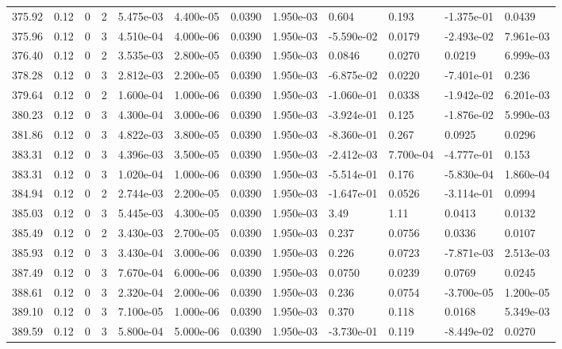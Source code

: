 \documentclass[preview]{standalone}
\begin{document}
{{{{{{{{{{{{\begin{tabular}{L{1.2cm}C{1.2cm} C{0.3cm}C{0.5cm} C{1.4cm}C{1.4cm} C{1.4cm}C{1.4cm} C{1.6cm}C{1.6cm} C{1.6cm}C{1.6cm}}
  375.92  &  0.12  & 0     &  2 &  5.475e-03  & 4.400e-05  &  0.0390&   1.950e-03& 0.604 & 0.193   &  -1.375e-01 & 0.0439  \\ 
  375.96  &  0.12  & 0     &  3 &  4.510e-04  & 4.000e-06  &  0.0390&   1.950e-03& -5.590e-02 & 0.0179   &  -2.493e-02 & 7.961e-03  \\ 
  376.40  &  0.12  & 0     &  2 &  3.535e-03  & 2.800e-05  &  0.0390&   1.950e-03& 0.0846 & 0.0270   &  0.0219 & 6.999e-03  \\ 
  378.28  &  0.12  & 0     &  3 &  2.812e-03  & 2.200e-05  &  0.0390&   1.950e-03& -6.875e-02 & 0.0220   &  -7.401e-01 & 0.236  \\ 
  379.64  &  0.12  & 0     &  2 &  1.600e-04  & 1.000e-06  &  0.0390&   1.950e-03& -1.060e-01 & 0.0338   &  -1.942e-02 & 6.201e-03  \\ 
  380.23  &  0.12  & 0     &  3 &  4.300e-04  & 3.000e-06  &  0.0390&   1.950e-03& -3.924e-01 & 0.125   &  -1.876e-02 & 5.990e-03  \\ 
  381.86  &  0.12  & 0     &  3 &  4.822e-03  & 3.800e-05  &  0.0390&   1.950e-03& -8.360e-01 & 0.267   &  0.0925 & 0.0296  \\ 
  383.31  &  0.12  & 0     &  3 &  4.396e-03  & 3.500e-05  &  0.0390&   1.950e-03& -2.412e-03 & 7.700e-04   &  -4.777e-01 & 0.153  \\ 
  383.31  &  0.12  & 0     &  3 &  1.020e-04  & 1.000e-06  &  0.0390&   1.950e-03& -5.514e-01 & 0.176   &  -5.830e-04 & 1.860e-04  \\ 
  384.94  &  0.12  & 0     &  2 &  2.744e-03  & 2.200e-05  &  0.0390&   1.950e-03& -1.647e-01 & 0.0526   &  -3.114e-01 & 0.0994  \\ 
  385.03  &  0.12  & 0     &  3 &  5.445e-03  & 4.300e-05  &  0.0390&   1.950e-03& 3.49 & 1.11   &  0.0413 & 0.0132  \\ 
  385.49  &  0.12  & 0     &  2 &  3.430e-03  & 2.700e-05  &  0.0390&   1.950e-03& 0.237 & 0.0756   &  0.0336 & 0.0107  \\ 
  385.93  &  0.12  & 0     &  3 &  3.430e-04  & 3.000e-06  &  0.0390&   1.950e-03& 0.226 & 0.0723   &  -7.871e-03 & 2.513e-03  \\ 
  387.49  &  0.12  & 0     &  3 &  7.670e-04  & 6.000e-06  &  0.0390&   1.950e-03& 0.0750 & 0.0239   &  0.0769 & 0.0245  \\ 
  388.61  &  0.12  & 0     &  3 &  2.320e-04  & 2.000e-06  &  0.0390&   1.950e-03& 0.236 & 0.0754   &  -3.700e-05 & 1.200e-05  \\ 
  389.10  &  0.12  & 0     &  3 &  7.100e-05  & 1.000e-06  &  0.0390&   1.950e-03& 0.370 & 0.118   &  0.0168 & 5.349e-03  \\ 
  389.59  &  0.12  & 0     &  3 &  5.800e-04  & 5.000e-06  &  0.0390&   1.950e-03& -3.730e-01 & 0.119   &  -8.449e-02 & 0.0270  \\ 
\hline 
\end{tabular} 

}}}}}}}}}}}}
\end{document}
